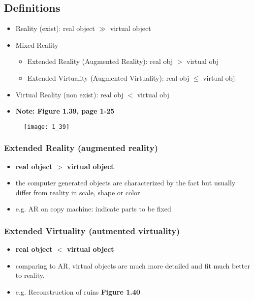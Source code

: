 \documentclass{standalone}
\begin{document}
\subsection{Definitions}

\begin{itemize}
	\item Reality (exist): real object $\gg$ virtual object
	\item Mixed Reality 
		\begin{itemize}
			\item Extended Reality (Augmented Reality): real obj $>$ virtual obj
			\item Extended Virtuality (Augmented Virtuality): real obj $\leq$ virtual obj
		\end{itemize}
	\item Virtual Reality (non exist): real obj $<$ virtual obj
	\item \textbf{Note: Figure 1.39, page 1-25}
\end{itemize}

\begin{figure}[h]
	\texttt{[image: 1\_39]}
\end{figure}

\subsubsection{Extended Reality (augmented reality)}

\begin{itemize}
	\item \textbf{real object $>$ virtual object}
	\item the computer generated objects are characterized by the fact but usually differ from reality in scale, shape or color.
	\item e.g. AR on copy machine: indicate parts to be fixed  
\end{itemize}

\subsubsection{Extended Virtuality (autmented virtuality)}

\begin{itemize}
	\item \textbf{real object $<$ virtual object}
	\item comparing to AR, virtual objects are much more detailed and fit much better to reality.
	\item e.g. Reconstruction of ruins \textbf{Figure 1.40}
\end{itemize}
\end{document}
